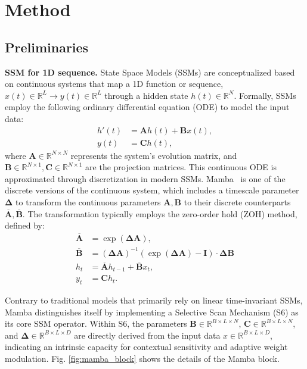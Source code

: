 \section{Method}
\label{sec:videomamba}

\subsection{Preliminaries}

\noindent\textbf{SSM for 1D sequence.}
State Space Models (SSMs) are conceptualized based on continuous systems that map a 1D function or sequence, $x(t) \in \mathbb{R}^L \rightarrow y(t) \in \mathbb{R}^L $ through a hidden state  $h(t) \in \mathbb{R}^N$. Formally, SSMs employ the following ordinary differential equation (ODE) to model the input data:
\begin{align} 
h'(t) &= {\mathbf A}h(t) + {\mathbf B}x(t), \\
y(t) &= {\mathbf C}h(t), 
\end{align}
where ${\mathbf A} \in \mathbb{R}^{N\times N}$ represents the system's evolution matrix, and ${\mathbf B} \in \mathbb{R}^{N\times 1}, {\mathbf C} \in \mathbb{R}^{ N\times 1}$ are the projection matrices. This continuous ODE is approximated through discretization in modern SSMs. Mamba~\cite{gu2023mamba} is one of the discrete versions of the continuous system, which includes a timescale parameter ${\mathbf \Delta}$ to transform the continuous parameters ${\mathbf A}, {\mathbf B}$ to their discrete counterparts $\overline{{\mathbf A}}, \overline{{\mathbf B}}$. The transformation typically employs the zero-order hold (ZOH) method, defined by:
\begin{align} 
\overline{{\mathbf A}} &= \exp({\mathbf \Delta \mathbf A}), \\
\overline{{\mathbf B}} &= ({\mathbf \Delta \mathbf A})^{-1} (\exp({\mathbf \Delta \mathbf A}) - {\mathbf I}) \cdot {\mathbf \Delta \mathbf B} \\
h_t &= \overline{{\mathbf A}} h_{t-1} + \overline{{\mathbf B}} x_t, \\
y_t &= {\mathbf C}h_t.
\end{align}

Contrary to traditional models that primarily rely on linear time-invariant SSMs, Mamba distinguishes itself by implementing a Selective Scan Mechanism (S6) as its core SSM operator. Within S6, the parameters ${\mathbf B} \in \mathbb{R}^{B\times L \times N}$, ${\mathbf C} \in \mathbb{R}^{B\times L \times N}$, and ${\mathbf \Delta} \in \mathbb{R}^{B \times L \times D}$ are directly derived from the input data $x \in \mathbb{R}^{B \times L \times D}$, indicating an intrinsic capacity for contextual sensitivity and adaptive weight modulation.
Fig. \ref{fig:mamba_block} shows the details of the Mamba block.

